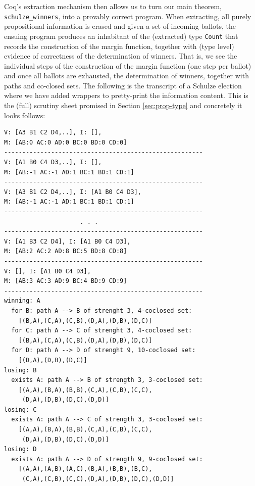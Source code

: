 Coq's extraction mechanism then allows us to turn our main theorem, 
\texttt{schulze\_winners}, into a
provably correct program. When extracting, all purely propositional
information is erased and given a set of incoming ballots, the ensuing program produces an inhabitant
of the (extracted) type \texttt{Count} that records the construction
of the margin function, together with (type level) evidence of
correctness of the determination of winners. That is, we see the
individual steps of the construction of the margin function (one
step per
ballot) and once all ballots are exhausted, the determination of
winners, together with paths and co-closed sets. The following is
the transcript of a Schulze election where we have added wrappers
to pretty-print the information content. This is the (full) scrutiny
sheet promised in Section \ref{sec:prop-type} and concretely 
it looks follows:
%
\begin{verbatim}
V: [A3 B1 C2 D4,..], I: [],
M: [AB:0 AC:0 AD:0 BC:0 BD:0 CD:0]
-------------------------------------------------------
V: [A1 B0 C4 D3,..], I: [],
M: [AB:-1 AC:-1 AD:1 BC:1 BD:1 CD:1]
-------------------------------------------------------
V: [A3 B1 C2 D4,..], I: [A1 B0 C4 D3],
M: [AB:-1 AC:-1 AD:1 BC:1 BD:1 CD:1]
-------------------------------------------------------
                     . . .
-------------------------------------------------------
V: [A1 B3 C2 D4], I: [A1 B0 C4 D3],
M: [AB:2 AC:2 AD:8 BC:5 BD:8 CD:8]
-------------------------------------------------------
V: [], I: [A1 B0 C4 D3],
M: [AB:3 AC:3 AD:9 BC:4 BD:9 CD:9]
-------------------------------------------------------
winning: A
  for B: path A --> B of strenght 3, 4-coclosed set: 
    [(B,A),(C,A),(C,B),(D,A),(D,B),(D,C)]
  for C: path A --> C of strenght 3, 4-coclosed set:
    [(B,A),(C,A),(C,B),(D,A),(D,B),(D,C)]
  for D: path A --> D of strenght 9, 10-coclosed set:
    [(D,A),(D,B),(D,C)]
losing: B
  exists A: path A --> B of strength 3, 3-coclosed set:
    [(A,A),(B,A),(B,B),(C,A),(C,B),(C,C),
     (D,A),(D,B),(D,C),(D,D)]
losing: C
  exists A: path A --> C of strength 3, 3-coclosed set:
    [(A,A),(B,A),(B,B),(C,A),(C,B),(C,C),
     (D,A),(D,B),(D,C),(D,D)]
losing: D
  exists A: path A --> D of strength 9, 9-coclosed set:
    [(A,A),(A,B),(A,C),(B,A),(B,B),(B,C),
     (C,A),(C,B),(C,C),(D,A),(D,B),(D,C),(D,D)]  
\end{verbatim}

